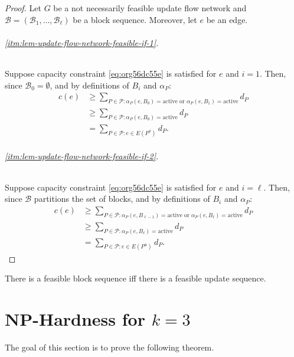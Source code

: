 \documentclass[fontsize=11pt,paper=a4]{book}
\begin{document}
\begin{proof}
Let \(G\) be a not necessarily feasible update flow network and \(\mathcal{B}=(\mathscr{B}_1,\dots,\mathscr{B}_{\ell})\) be a block sequence.
Moreover, let \(e\) be an edge.

\paragraph{\ref{itm:lem-update-flow-network-feasible-if-1}.}
Suppose capacity constraint \ref{eq:org56dc55e}  is satisfied for \(e\) and \(i=1\).
Then, since \(\mathscr{B}_0=\emptyset\), and by definitions of \(B_i\) and \(\alpha_P\):
\begin{align*}
c(e)
&\geq\sum_{P\in\mathcal{P}:\alpha_P(e,B_0)=\mathrm{active}\text{ or }\alpha_P(e,B_1)=\mathrm{active}}d_P\\
&\geq\sum_{P\in\mathcal{P}:\alpha_P(e,B_0)=\mathrm{active}}d_P\\
&=\sum_{P\in\mathcal{P}:e\in E(P^o)}d_P.
\end{align*}
\paragraph{\ref{itm:lem-update-flow-network-feasible-if-2}.}
Suppose capacity constraint \ref{eq:org56dc55e}  is satisfied for \(e\) and \(i=\ell\).
Then, since \(\mathcal{B}\) partitions the set of blocks, and by definitions of \(B_i\) and \(\alpha_P\):
\begin{align*}
c(e)
&\geq\sum_{P\in\mathcal{P}:\alpha_P(e,B_{\ell-1})=\mathrm{active}\text{ or }\alpha_P(e,B_{\ell})=\mathrm{active}}d_P\\
&\geq\sum_{P\in\mathcal{P}:\alpha_P(e,B_{\ell})=\mathrm{active}}d_P\\
&=\sum_{P\in\mathcal{P}:e\in E(P^u)}d_P.
\end{align*}
\end{proof}

\begin{corollary}
There is a feasible block sequence iff there is a feasible update sequence.
\label{org9cfe652}
\end{corollary}

\part{\(\textbf{NP}\)-Hardness for \(k=3\)}
\label{sec:org4b3c816}

The goal of this section is to prove the following theorem.
\end{document}

